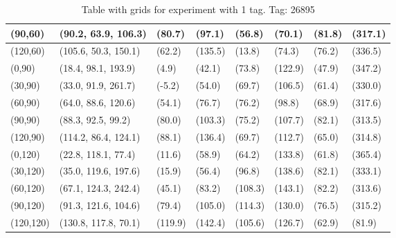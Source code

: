 \begin{table}[H]
\begin{tabular}{|l|l|l|l|l|l|l|l|}
    (90,60)  	& (90.2, 63.9, 106.3) 	 & (80.7) 	& (97.1)	& (56.8)	 & (70.1) 	 & (81.8)	 & (317.1)	\\ \hline
    (120,60)  	& (105.6, 50.3, 150.1) 	 & (62.2) 	& (135.5)	& (13.8)	 & (74.3) 	 & (76.2)	 & (336.5)	\\ \hline
    (0,90)  	& (18.4, 98.1, 193.9) 	 & (4.9) 	& (42.1)	& (73.8)	 & (122.9) 	 & (47.9)	 & (347.2)	\\ \hline
    (30,90) 	& (33.0, 91.9, 261.7) 	 & (-5.2) 	& (54.0)	& (69.7)	 & (106.5) 	 & (61.4)	 & (330.0)	\\ \hline
    (60,90) 	& (64.0, 88.6, 120.6) 	 & (54.1) 	& (76.7)	& (76.2)	 & (98.8) 	 & (68.9)	 & (317.6)	\\ \hline
    (90,90) 	& (88.3, 92.5, 99.2) 	 & (80.0) 	& (103.3)	& (75.2)	 & (107.7) 	 & (82.1)	 & (313.5)	\\ \hline
    (120,90) 	& (114.2, 86.4, 124.1) 	 & (88.1) 	& (136.4)	& (69.7)	 & (112.7) 	 & (65.0)	 & (314.8)	\\ \hline
    (0,120) 	& (22.8, 118.1, 77.4) 	 & (11.6) 	& (58.9)	& (64.2)	 & (133.8) 	 & (61.8)	 & (365.4)	\\ \hline
    (30,120) 	& (35.0, 119.6, 197.6) 	 & (15.9) 	& (56.4)	& (96.8)	 & (138.6) 	 & (82.1)	 & (333.1)	\\ \hline
    (60,120) 	& (67.1, 124.3, 242.4) 	 & (45.1) 	& (83.2)	& (108.3)	 & (143.1) 	 & (82.2)	 & (313.6)	\\ \hline
    (90,120) 	& (91.3, 121.6, 104.6) 	 & (79.4) 	& (105.0)	& (114.3)	 & (130.0) 	 & (76.5)	 & (315.2)	\\ \hline
    (120,120) 	& (130.8, 117.8, 70.1) 	 & (119.9) 	& (142.4)	& (105.6)	 & (126.7) 	 & (62.9)	 & (81.9)	\\ \hline
    \end{tabular}
\label{Tab:one-tag-experiment-result}
\caption{Table with grids for experiment with 1 tag. Tag: 26895}
\end{table}


